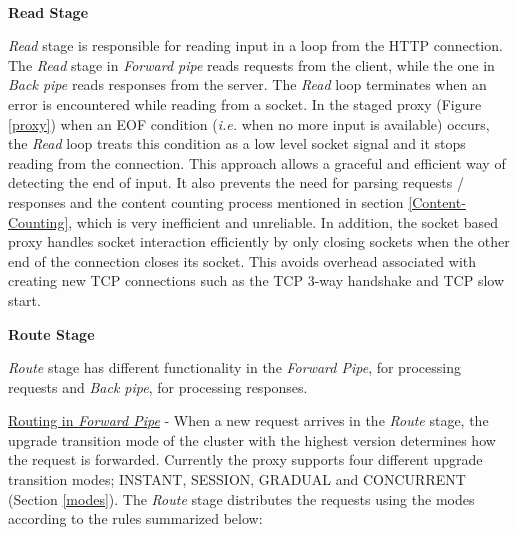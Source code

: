 \documentclass[a4paper,11pt,twoside]{article}
\begin{document}
\noindent\\
\textbf{Read Stage} 

\noindent
\textit{Read} stage is responsible for reading input in a loop from the HTTP connection. The \textit{Read} stage in \textit{Forward pipe} reads requests from the client, while the one in \textit{Back pipe} reads responses from the server. The \textit{Read} loop terminates when an error is encountered while reading from a socket. In the staged proxy (Figure \ref{proxy}) when an EOF condition (\textit{i.e.} when no more input is available) occurs, the \textit{Read} loop treats this condition as a low level socket signal and it stops reading from the connection. This approach allows a graceful and efficient way of detecting the end of input. It also prevents the need for parsing requests / responses and the content counting process mentioned in section \ref{Content-Counting}, which is very inefficient and unreliable.  In addition, the socket based proxy handles socket interaction efficiently by only closing sockets when the other end of the connection closes its socket.  This avoids overhead associated with creating new TCP connections such as the TCP 3-way handshake and TCP slow start.\bigskip

\noindent
\textbf{Route Stage} 

\noindent
\textit{Route} stage has different functionality in the \textit{Forward Pipe}, for processing requests and \textit{Back pipe}, for processing responses. \bigskip  

\noindent
\underline{Routing in \textit{Forward Pipe}} - When a new request arrives in the \textit{Route} stage, the upgrade transition mode of the cluster with the highest version determines how the request is forwarded. Currently the proxy supports four different upgrade transition modes; INSTANT, SESSION, GRADUAL and CONCURRENT (Section \ref{modes}). The \textit{Route} stage distributes the requests using the modes according to the rules summarized below: 
\end{document}
